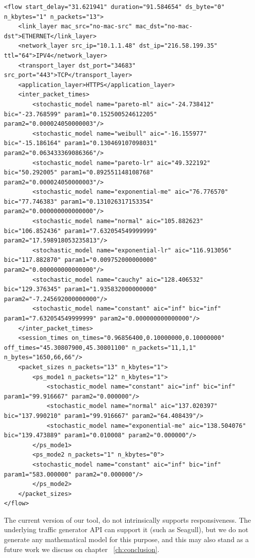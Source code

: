 \begin{verbatim}
<flow start_delay="31.621941" duration="91.584654" ds_byte="0" n_kbytes="1" n_packets="13">
	<link_layer mac_src="no-mac-src" mac_dst="no-mac-dst">ETHERNET</link_layer>
	<network_layer src_ip="10.1.1.48" dst_ip="216.58.199.35" ttl="64">IPV4</network_layer>
	<transport_layer dst_port="34683" src_port="443">TCP</transport_layer>
	<application_layer>HTTPS</application_layer>
	<inter_packet_times>
		<stochastic_model name="pareto-ml" aic="-24.738412" bic="-23.768599" param1="0.152500524612205" param2="0.000024050000003"/>
		<stochastic_model name="weibull" aic="-16.155977" bic="-15.186164" param1="0.130469107098031" param2="0.063433369086366"/>
		<stochastic_model name="pareto-lr" aic="49.322192" bic="50.292005" param1="0.892551148108768" param2="0.000024050000003"/>
		<stochastic_model name="exponential-me" aic="76.776570" bic="77.746383" param1="0.131026317153354" param2="0.000000000000000"/>
        <stochastic_model name="normal" aic="105.882623" bic="106.852436" param1="7.632054549999999" param2="17.598918053235813"/>
        <stochastic_model name="exponential-lr" aic="116.913056" bic="117.882870" param1="0.009752000000000" param2="0.000000000000000"/>
        <stochastic_model name="cauchy" aic="128.406532" bic="129.376345" param1="1.935832000000000" param2="-7.245692000000000"/>
        <stochastic_model name="constant" aic="inf" bic="inf" param1="7.632054549999999" param2="0.000000000000000"/>
    </inter_packet_times>
	<session_times on_times="0.96856400,0.10000000,0.10000000" off_times="45.30807900,45.30801100" n_packets="11,1,1" n_bytes="1650,66,66"/>
	<packet_sizes n_packets="13" n_kbytes="1">
		<ps_mode1 n_packets="12" n_kbytes="1">
			<stochastic_model name="constant" aic="inf" bic="inf" param1="99.916667" param2="0.000000"/>
			<stochastic_model name="normal" aic="137.020397" bic="137.990210" param1="99.916667" param2="64.408439"/>
			<stochastic_model name="exponential-me" aic="138.504076" bic="139.473889" param1="0.010008" param2="0.000000"/>
		</ps_mode1>
		<ps_mode2 n_packets="1" n_kbytes="0">
		<stochastic_model name="constant" aic="inf" bic="inf" param1="583.000000" param2="0.000000"/>
		</ps_mode2>
	</packet_sizes>
</flow>
\end{verbatim}

The current version of our tool, do not intrinsically supports responsiveness. The underlying traffic generator API can support it (such as Seagull\cite{web-seagull}), but we do not generate any mathematical model for this purpose, and this may also stand as a future work we discuss on chapter ~\ref{ch:conclusion}. 

